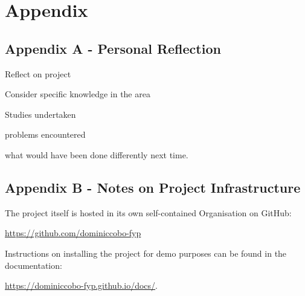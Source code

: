 \chapter{Appendix}

\section{Appendix A - Personal Reflection}

Reflect on project

Consider specific knowledge in the area

Studies undertaken

problems encountered

what would have been done differently next time.

\section{Appendix B - Notes on Project Infrastructure}

The project itself is hosted in its own self-contained Organisation on GitHub:

\url{https://github.com/dominiccobo-fyp}

Instructions on installing the project for demo purposes can be found in the documentation:

\url{https://dominiccobo-fyp.github.io/docs/}.